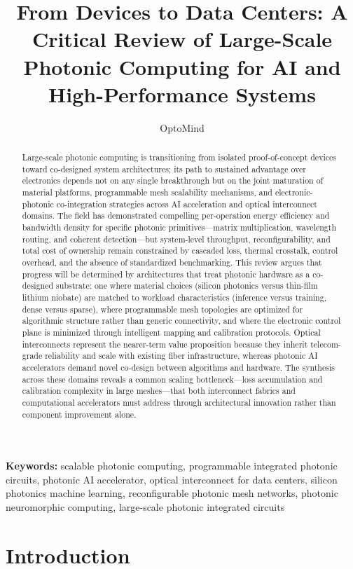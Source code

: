 \documentclass[11pt]{article}
\title{From Devices to Data Centers: A Critical Review of Large-Scale Photonic Computing for AI and High-Performance Systems}
\author{OptoMind}
\date{}
\begin{document}
\maketitle

\begin{abstract}
Large-scale photonic computing is transitioning from isolated proof-of-concept devices toward co-designed system architectures; its path to sustained advantage over electronics depends not on any single breakthrough but on the joint maturation of material platforms, programmable mesh scalability mechanisms, and electronic-photonic co-integration strategies across AI acceleration and optical interconnect domains. The field has demonstrated compelling per-operation energy efficiency and bandwidth density for specific photonic primitives---matrix multiplication, wavelength routing, and coherent detection---but system-level throughput, reconfigurability, and total cost of ownership remain constrained by cascaded loss, thermal crosstalk, control overhead, and the absence of standardized benchmarking. This review argues that progress will be determined by architectures that treat photonic hardware as a co-designed substrate: one where material choices (silicon photonics versus thin-film lithium niobate) are matched to workload characteristics (inference versus training, dense versus sparse), where programmable mesh topologies are optimized for algorithmic structure rather than generic connectivity, and where the electronic control plane is minimized through intelligent mapping and calibration protocols. Optical interconnects represent the nearer-term value proposition because they inherit telecom-grade reliability and scale with existing fiber infrastructure, whereas photonic AI accelerators demand novel co-design between algorithms and hardware. The synthesis across these domains reveals a common scaling bottleneck---loss accumulation and calibration complexity in large meshes---that both interconnect fabrics and computational accelerators must address through architectural innovation rather than component improvement alone.
\end{abstract}

\noindent\textbf{Keywords:} scalable photonic computing, programmable integrated photonic circuits, photonic AI accelerator, optical interconnect for data centers, silicon photonics machine learning, reconfigurable photonic mesh networks, photonic neuromorphic computing, large-scale photonic integrated circuits

\section{Introduction}\label{introduction}
\end{document}
